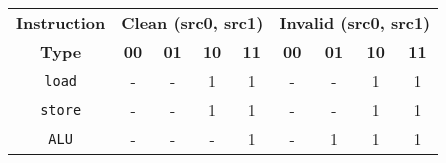 

\begin{tabular}{|c||c|c|c|c||c|c|c|c|}
\hline

{\bf Instruction} & \multicolumn{4}{c||}{\bf Clean (src0, src1)} & \multicolumn{4}{c|}{\bf Invalid (src0, src1)} \\ \cline{2-9}
{\bf Type} & {\bf 00} & {\bf 01} & {\bf 10} & {\bf 11} & {\bf 00} & {\bf 01} & {\bf 10} & {\bf 11} \\ \hline\hline

{\tt load} & - & - & 1 & 1 & - & - & 1 & 1 \\ \hline
{\tt store} & - & - & 1 & 1 & - & - & 1 & 1 \\ \hline
{\tt ALU} & - & - & - & 1 & - & 1 & 1 & 1 \\ \hline

\end{tabular}
